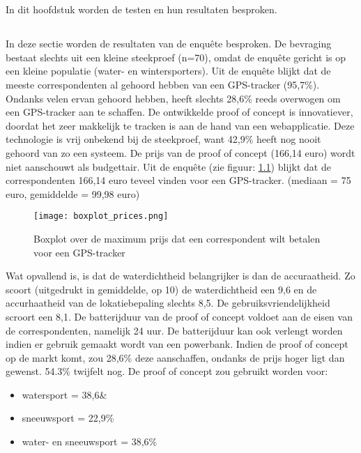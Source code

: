 \chapter{}
\label{ch:resultaten}
In dit hoofdstuk worden de testen en hun resultaten besproken.
\section{}
In deze sectie worden de resultaten van de enquête besproken.
\newline
De bevraging bestaat slechts uit een kleine steekproef (n=70), omdat de enquête gericht is op een kleine populatie (water- en wintersporters). Uit de enquête blijkt dat de meeste correspondenten al gehoord hebben van een GPS-tracker (95,7\%). Ondanks velen ervan gehoord hebben, heeft slechts 28,6\% reeds overwogen om een GPS-tracker aan te schaffen. De ontwikkelde proof of concept is innovatiever, doordat het zeer makkelijk te tracken is aan de hand van een webapplicatie. Deze technologie is vrij onbekend bij de steekproef, want 42,9\% heeft nog nooit gehoord van zo een systeem. 
\newline
De prijs van de proof of concept (166,14 euro) wordt niet aanschouwt als budgettair. Uit de enquête (zie figuur: \ref{graph:price}) blijkt dat de correspondenten 166,14 euro teveel vinden voor een GPS-tracker. (mediaan = 75 euro, gemiddelde = 99,98 euro) 
\begin{figure}
	\texttt{[image: boxplot\_prices.png]}
	\caption[Boxplot maximum prijs]{Boxplot over de maximum prijs dat een correspondent wilt betalen voor een GPS-tracker}
	\label{graph:price}
\end{figure}
\newline
Wat opvallend is, is dat de waterdichtheid belangrijker is dan de accuraatheid. Zo scoort (uitgedrukt in gemiddelde, op 10) de waterdichtheid een 9,6 en de accurhaatheid van de lokatiebepaling slechts 8,5. De gebruiksvriendelijkheid scroort een 8,1. 
\newline
De batterijduur van de proof of concept voldoet aan de eisen van de correspondenten, namelijk 24 uur. De batterijduur kan ook verlengt worden indien er gebruik gemaakt wordt van een powerbank.
\newline
Indien de proof of concept op de markt komt, zou 28,6\% deze aanschaffen, ondanks de prijs hoger ligt dan gewenst. 54.3\% twijfelt nog. 
\newline
De proof of concept zou gebruikt worden voor:
\begin{itemize}
	\item watersport = 38,6\&
	\item sneeuwsport = 22,9\%
	\item water- en sneeuwsport = 38,6\%
\end{itemize}
\pagebreak
